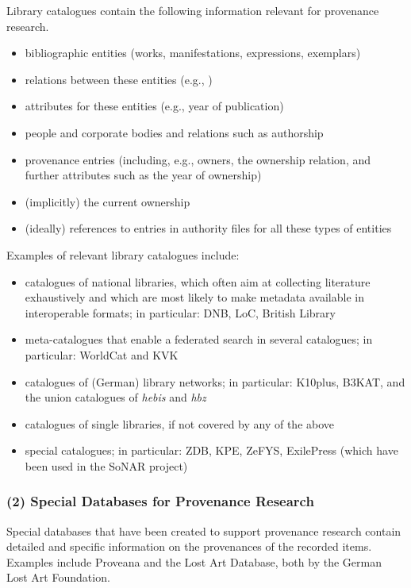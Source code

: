Library catalogues contain the following information relevant for provenance research.
%
\begin{itemize}
  \item
    bibliographic entities (works, manifestations, expressions, exemplars)
  \item
    relations between these entities (e.g., )
  \item
    attributes for these entities (e.g., year of publication)
  \item
    people and corporate bodies and relations such as authorship
  \item
    provenance entries (including, e.g., owners, the ownership relation, and further attributes such as the year of ownership)
  \item
    (implicitly) the current ownership
  \item
    (ideally) references to entries in authority files for all these types of entities
\end{itemize}
%
Examples of relevant library catalogues include:
%
\begin{itemize}
  \item
    catalogues of national libraries, which often aim at collecting literature exhaustively
    and which are most likely to make metadata available in interoperable formats;
    in particular: \gls{DNB}, \gls{LoC}, British Library
  \item
    meta-catalogues that enable a federated search in several catalogues;
    in particular: WorldCat and \gls{KVK}
  \item
    catalogues of (German) library networks;
    in particular: \gls{K10plus}, \gls{B3KAT}, and the union catalogues of \emph{hebis} and \emph{hbz}
  \item
    catalogues of single libraries, if not covered by any of the above
  \item
    special catalogues;
    in particular: \gls{ZDB}, \gls{KPE}, ZeFYS, ExilePress (which have been used in the \gls{SoNAR} project)  
\end{itemize}

\subsubsection{(2) Special Databases for Provenance Research}

Special databases that have been created to support provenance research contain detailed and specific information on
the provenances of the recorded items.
Examples include Proveana and the Lost Art Database, both by the German Lost Art Foundation. 

